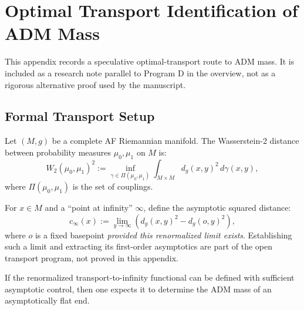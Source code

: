 \section{Optimal Transport Identification of ADM Mass}
\label{app:TransportMass}

This appendix records a speculative optimal-transport route to ADM mass. It is included as a research note parallel to Program D in the overview, not as a rigorous alternative proof used by the manuscript.

\subsection{Formal Transport Setup}
Let $(M, g)$ be a complete AF Riemannian manifold. The Wasserstein-2 distance between probability measures $\mu_0, \mu_1$ on $M$ is:
\begin{equation}
    W_2(\mu_0, \mu_1)^2 := \inf_{\gamma \in \Pi(\mu_0, \mu_1)} \int_{M \times M} d_g(x, y)^2 \, d\gamma(x, y),
\end{equation}
where $\Pi(\mu_0, \mu_1)$ is the set of couplings.

\begin{definition}
For $x \in M$ and a ``point at infinity'' $\infty$, define the asymptotic squared distance:
\begin{equation}
    c_\infty(x) := \lim_{y \to \infty} \left( d_g(x, y)^2 - d_g(o, y)^2 \right),
\end{equation}
where $o$ is a fixed basepoint \emph{provided this renormalized limit exists}. Establishing such a limit and extracting its first-order asymptotics are part of the open transport program, not proved in this appendix.
\end{definition}

\begin{theorem}\label{thm:ADMTransport}
If the renormalized transport-to-infinity functional can be defined with sufficient asymptotic control, then one expects it to determine the ADM mass of an asymptotically flat end.
\end{theorem}


